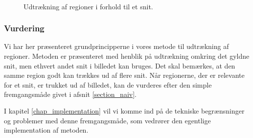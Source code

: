 {\begin{figure}[!p]
{        \label{sammen_floodfill}}\\
    \caption[]{Udtrækning af regioner i forhold til et snit.}
    \label{sammensaetning}
\end{figure}

\subsubsection{Vurdering}
Vi har her præsenteret grundprincipperne i vores metode til udtrækning
af regioner. Metoden er præsenteret med henblik på udtrækning omkring
det gyldne snit, men ethvert andet snit i billedet kan bruges. Det skal
bemærkes, at den samme region godt kan trækkes ud af flere snit. Når
regionerne, der er relevante for et snit, er trukket ud af billedet, kan
de vurderes efter den simple fremgangsmåde givet i afsnit
\ref{section_naiv}.

I kapitel \ref{chap_implementation} vil vi komme ind på de tekniske
begrænsninger og problemer med denne fremgangsmåde, som vedrører den
egentlige implementation af metoden.

}

